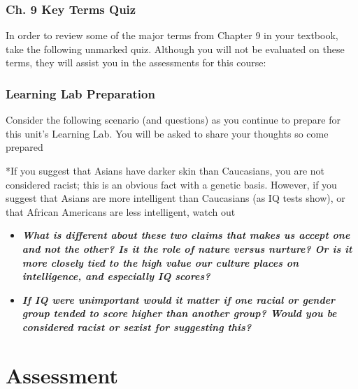 \documentclass[
]{book}
\providecommand{\tightlist}{%
  \setlength{\itemsep}{0pt}\setlength{\parskip}{0pt}}
\begin{document}
\begin{reflect}
\hypertarget{ch.-9-key-terms-quiz}{%
\subsubsection*{Ch. 9 Key Terms Quiz}\label{ch.-9-key-terms-quiz}}

In order to review some of the major terms from Chapter 9 in your textbook, take the following unmarked quiz. Although you will not be evaluated on these terms, they will assist you in the assessments for this course:

\hypertarget{learning-lab-preparation-6}{%
\subsubsection*{Learning Lab Preparation}\label{learning-lab-preparation-6}}

Consider the following scenario (and questions) as you continue to prepare for this unit's Learning Lab. You will be asked to share your thoughts so come prepared

*If you suggest that Asians have darker skin than Caucasians, you are not considered racist; this is an obvious fact with a genetic basis. However, if you suggest that Asians are more intelligent than Caucasians (as IQ tests show), or that African Americans are less intelligent, watch out

\begin{itemize}
\tightlist
\item
  \textbf{\emph{What is different about these two claims that makes us accept one and not the other? Is it the role of nature versus nurture? Or is it more closely tied to the high value our culture places on intelligence, and especially IQ scores?}}\\
\item
  \textbf{\emph{If IQ were unimportant would it matter if one racial or gender group tended to score higher than another group? Would you be considered racist or sexist for suggesting this?}}
\end{itemize}
\end{reflect}

\hypertarget{assessment-1}{%
\section*{Assessment}\label{assessment-1}}
\end{document}
